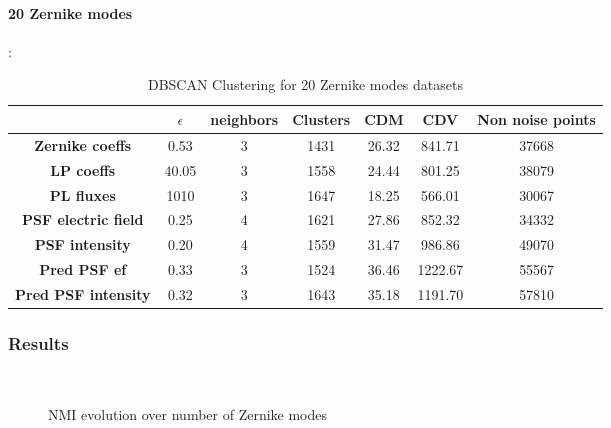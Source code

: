 		\paragraph{20 Zernike modes}:
		\begin{table}[h!]
			\centering
			\begin{tabular}{|c|c|c|c|c|c|c|}
				\hline
				\textbf{} & \textbf{$\epsilon$} & \textbf{neighbors} & \textbf{Clusters} & \textbf{CDM} & \textbf{CDV} & \textbf{Non noise points}\\
				\hline
				\textbf{Zernike coeffs} & 0.53 & 3 & 1431 & 26.32 & 841.71 & 37668 \\
				\hline
				\textbf{LP coeffs} & 40.05 & 3 & 1558 & 24.44 & 801.25 & 38079 \\
				\hline
				\textbf{PL fluxes} & 1010 & 3 & 1647 & 18.25 & 566.01 & 30067 \\
				\hline
				\textbf{PSF electric field} & 0.25 & 4 & 1621 & 27.86 & 852.32 & 34332 \\
				\hline
				\textbf{PSF intensity} & 0.20 & 4 & 1559 & 31.47 & 986.86 & 49070 \\
				\hline
				\textbf{Pred PSF ef} & 0.33 & 3 & 1524 & 36.46 & 1222.67 & 55567 \\
				\hline
				\textbf{Pred PSF intensity} & 0.32 & 3 & 1643 & 35.18 & 1191.70 & 57810 \\
				\hline
			\end{tabular}
		\caption{DBSCAN Clustering for 20 Zernike modes datasets}
		\end{table}
		\FloatBarrier
		
	\subsubsection{Results}
	
	
		\begin{figure*}[ht!]
			\centering
			\hspace{\fill}
			\\
			\hspace{\fill}
			\caption{NMI evolution over number of Zernike modes}
		\end{figure*}
		\FloatBarrier
		
